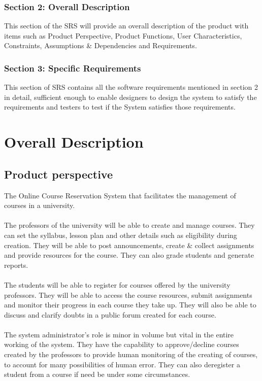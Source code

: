 \documentclass[12pt, a4]{report}
\begin{document}
\subsection{Section 2: Overall Description} This section of the SRS will provide an overall description of the product with items such as Product Perspective, Product Functions, User Characteristics, Constraints, Assumptions \& Dependencies and Requirements.
\subsection{Section 3: Specific Requirements} This section of SRS contains all the software requirements mentioned in section 2 in detail, sufficient enough to enable designers to design the system to satisfy the requirements and testers to test if the System satisfies those requirements. 


\chapter{Overall Description}

\section{Product perspective}
The Online Course Reservation System that facilitates the management of courses in a university.
\\\\
The professors of the university will be able to create and manage courses. They can set the syllabus, lesson plan and other details such as eligibility during creation. They will be able to post announcements, create \& collect assignments and provide resources for the course. They can also grade students and generate reports.
\\\\
The students will be able to register for courses offered by the university professors. They will be able to access the course resources, submit assignments and monitor their progress in each course they take up. They will also be able to discuss and clarify doubts in a public forum created for each course.
\\\\
The system administrator's role is minor in volume but vital in the entire working of the system. They have the capability to approve/decline courses created by the professors to provide human monitoring of the creating of courses, to account for many possibilities of human error. They can also deregister a student from a course if need be under some circumstances.
\end{document}
